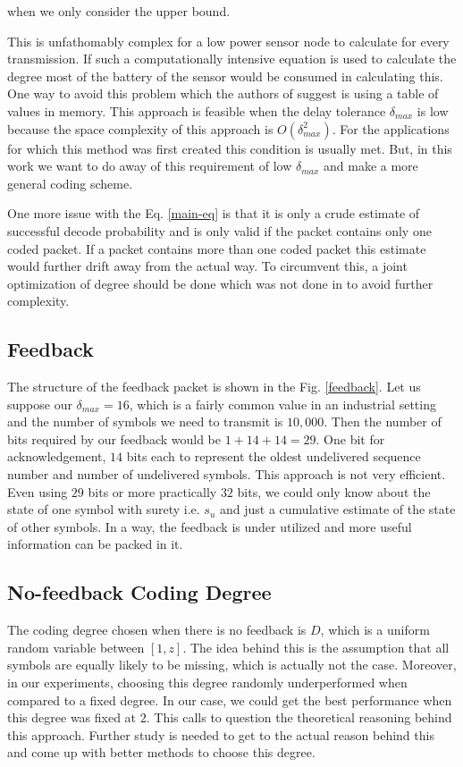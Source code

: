 when we only consider the upper bound.

This is unfathomably complex for a low power sensor node to calculate for every transmission. If such a computationally intensive equation is used to calculate the degree most of the battery of the sensor would be consumed in calculating this. One way to avoid this problem which the authors of \cite{borkotokyicc} suggest is using a table of values in memory. This approach is feasible when the delay tolerance $\delta_{max}$ is low because the space complexity of this approach is $O\left(\delta_{max}^2\right)$. For the applications for which this method was first created this condition is usually met. But, in this work we want to do away of this requirement of low $\delta_{max}$ and make a more general coding scheme.

One more issue with the Eq. \ref{main-eq} is that it is only a crude estimate of successful decode probability and is only valid if the packet contains only one coded packet. If a packet contains more than one coded packet this estimate would further drift away from the actual way. To circumvent this, a joint optimization of degree should be done which was not done in \cite{borkotokyicc} to avoid further complexity.


\subsection{Feedback}
\label{feedback-issue}
The structure of the feedback packet is shown in the Fig. \ref{feedback}. Let us suppose our $\delta_{max} = 16$, which is a fairly common value in an industrial setting and the number of symbols we need to transmit is $10,000$. Then the number of bits required by our feedback would be $1 + 14 + 14 = 29$. One bit for acknowledgement, $14$ bits each to represent the oldest undelivered sequence number and number of undelivered symbols. This approach is not very efficient. Even using $29$ bits or more practically $32$ bits, we could only know about the state of one symbol with surety i.e. $s_u$ and just a cumulative estimate of the state of other symbols. In a way, the feedback is under utilized and more useful information can be packed in it.

\subsection{No-feedback Coding Degree}
\label{no-fd}
The coding degree chosen when there is no feedback is $D$, which is a uniform random variable between $[1, z]$. The idea behind this is the assumption that all symbols are equally likely to be missing, which is actually not the case. Moreover, in our experiments, choosing this degree randomly underperformed when compared to a fixed degree. In our case, we could get the best performance when this degree was fixed at $2$. This calls to question the theoretical reasoning behind this approach. Further study is needed to get to the actual reason behind this and come up with better methods to choose this degree.

